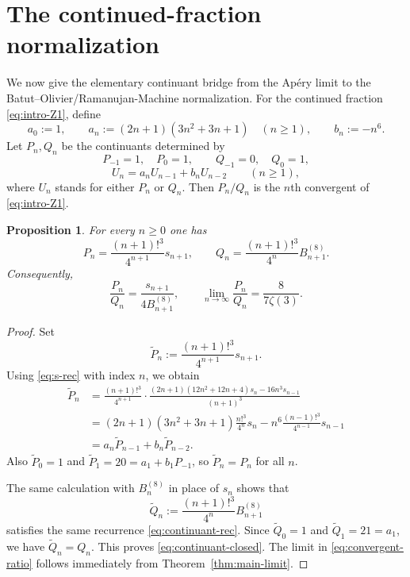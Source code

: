 \documentclass[11pt]{amsart}
\numberwithin{equation}{section}
\theoremstyle{plain}
\newtheorem{proposition}[theorem]{Proposition}
\theoremstyle{definition}
\theoremstyle{remark}
\begin{document}
\section{The continued-fraction normalization}\label{sec:cf}

We now give the elementary continuant bridge from the Apéry limit to the Batut--Olivier/Ramanujan-Machine normalization. For the continued fraction \eqref{eq:intro-Z1}, define
\[
a_0:=1,
\qquad
a_n:=(2n+1)(3n^2+3n+1)\quad(n\ge 1),
\qquad
b_n:=-n^6.
\]
Let $P_n,Q_n$ be the continuants determined by
\[
P_{-1}=1,\quad P_0=1,
\qquad
Q_{-1}=0,\quad Q_0=1,
\]
\begin{equation}\label{eq:continuant-rec}
U_n=a_nU_{n-1}+b_nU_{n-2}
\qquad(n\ge 1),
\end{equation}
where $U_n$ stands for either $P_n$ or $Q_n$. Then $P_n/Q_n$ is the $n$th convergent of \eqref{eq:intro-Z1}.

\begin{proposition}\label{prop:continuants}
For every $n\ge 0$ one has
\begin{equation}\label{eq:continuant-closed}
P_n=\frac{(n+1)!^3}{4^{n+1}}s_{n+1},
\qquad
Q_n=\frac{(n+1)!^3}{4^n}B_{n+1}^{(8)}.
\end{equation}
Consequently,
\begin{equation}\label{eq:convergent-ratio}
\frac{P_n}{Q_n}=\frac{s_{n+1}}{4B_{n+1}^{(8)}},
\qquad
\lim_{n\to\infty}\frac{P_n}{Q_n}=\frac{8}{7\zeta(3)}.
\end{equation}
\end{proposition}

\begin{proof}
Set
\[
\widetilde P_n:=\frac{(n+1)!^3}{4^{n+1}}s_{n+1}.
\]
Using \eqref{eq:s-rec} with index $n$, we obtain
\begin{align*}
\widetilde P_n
&=\frac{(n+1)!^3}{4^{n+1}}\cdot\frac{(2n+1)(12n^2+12n+4)s_n-16n^3s_{n-1}}{(n+1)^3}\\
&=(2n+1)(3n^2+3n+1)\frac{n!^3}{4^n}s_n-n^6\frac{(n-1)!^3}{4^{n-1}}s_{n-1}\\
&=a_n\widetilde P_{n-1}+b_n\widetilde P_{n-2}.
\end{align*}
Also $\widetilde P_0=1$ and $\widetilde P_1=20=a_1+b_1P_{-1}$, so $\widetilde P_n=P_n$ for all $n$.

The same calculation with $B_n^{(8)}$ in place of $s_n$ shows that
\[
\widetilde Q_n:=\frac{(n+1)!^3}{4^n}B_{n+1}^{(8)}
\]
satisfies the same recurrence \eqref{eq:continuant-rec}. Since $\widetilde Q_0=1$ and $\widetilde Q_1=21=a_1$, we have $\widetilde Q_n=Q_n$. This proves \eqref{eq:continuant-closed}. The limit in \eqref{eq:convergent-ratio} follows immediately from Theorem~\ref{thm:main-limit}.
\end{proof}
\end{document}
